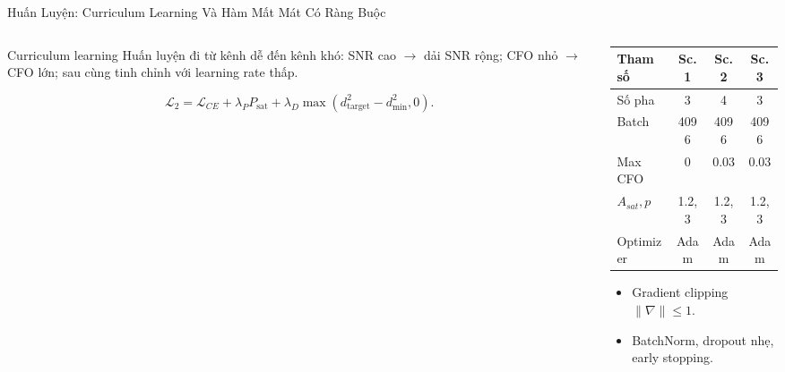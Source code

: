 \documentclass[aspectratio=169,11pt]{beamer}
\begin{document}
\begin{frame}{Huấn Luyện: Curriculum Learning Và Hàm Mất Mát Có Ràng Buộc}
  \begin{columns}[T,onlytextwidth]
    \begin{column}{0.52\textwidth}
      \begin{block}{Curriculum learning}
      Huấn luyện đi từ kênh dễ đến kênh khó: SNR cao $\rightarrow$ dải SNR rộng; CFO nhỏ $\rightarrow$ CFO lớn; sau cùng tinh chỉnh với learning rate thấp.
      \end{block}
      \begin{equation*}
      \mathcal{L}_{2}= \mathcal{L}_{CE}
      +\lambda_P P_{\text{sat}}
      +\lambda_D\max(d_{\text{target}}^2-d_{\min}^2,0).
      \end{equation*}
    \end{column}
    \begin{column}{0.46\textwidth}
      \begin{table}
      \scriptsize
      \begin{tabularx}{\linewidth}{lccc}
      \toprule
      Tham số & Sc.1 & Sc.2 & Sc.3\\
      \midrule
      Số pha & 3 & 4 & 3\\
      Batch & 4096 & 4096 & 4096\\
      Max CFO & 0 & 0.03 & 0.03\\
      $A_{sat},p$ & 1.2,3 & 1.2,3 & 1.2,3\\
      Optimizer & Adam & Adam & Adam\\
      \bottomrule
      \end{tabularx}
      \end{table}
      \begin{itemize}
        \item Gradient clipping $\|\nabla\|\leq1$.
        \item BatchNorm, dropout nhẹ, early stopping.
      \end{itemize}
    \end{column}
  \end{columns}
\end{frame}
\end{document}
